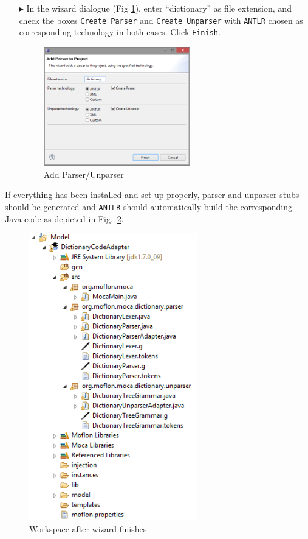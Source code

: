\begin{enumerate}
\item[$\blacktriangleright$] In the wizard dialogue (Fig \ref{fig:moca-2-AddParser}), enter ``dictionary'' as file extension, and check the boxes \texttt{Create Parser} and \texttt{Create Unparser} with \texttt{ANTLR} chosen as corresponding technology in both cases.  Click \texttt{Finish}. 

\begin{figure}[!htbp]
\begin{center}
 \includegraphics[width=0.6\textwidth]{pics/moca/2TextToMocaTree/2-AddParser.png}
  \caption{Add Parser/Unparser}
  \label{fig:moca-2-AddParser}
\end{center}
\end{figure}

\end{enumerate}

If everything has been installed and set up properly, parser and unparser stubs should be generated and \texttt{ANTLR} should automatically build the corresponding Java code as depicted in Fig.~\ref{fig:moca-3-WizardResult}. 

\begin{figure}[!htbp]
\begin{center}
 \includegraphics[width=0.65\textwidth]{pics/moca/2TextToMocaTree/3-WizardResult.png}
  \caption{Workspace after wizard finishes}
  \label{fig:moca-3-WizardResult}
\end{center}
\end{figure}
